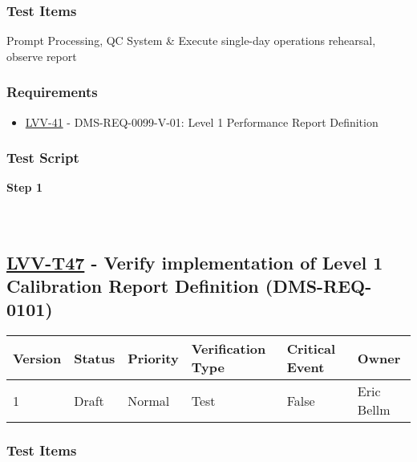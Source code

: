 \hypertarget{test-items-135}{%
\subsubsection{Test Items}\label{test-items-135}}

Prompt Processing, QC System \& Execute single-day operations rehearsal,
observe report

\hypertarget{requirements-136}{%
\subsubsection{Requirements}\label{requirements-136}}

\begin{itemize}
\tightlist
\item
  \href{https://jira.lsstcorp.org/browse/LVV-41}{LVV-41} -
  DMS-REQ-0099-V-01: Level 1 Performance Report Definition
\end{itemize}

\hypertarget{test-script-136}{%
\subsubsection{Test Script}\label{test-script-136}}

\textbf{Step 1}\\
~\\
~\\

\hypertarget{lvv-t47---verify-implementation-of-level-1-calibration-report-definition-dms-req-0101}{%
\subsection{\texorpdfstring{\href{https://jira.lsstcorp.org/secure/Tests.jspa\#/testCase/LVV-T47}{LVV-T47}
- Verify implementation of Level 1 Calibration Report Definition
(DMS-REQ-0101)}{LVV-T47 - Verify implementation of Level 1 Calibration Report Definition (DMS-REQ-0101)}}\label{lvv-t47---verify-implementation-of-level-1-calibration-report-definition-dms-req-0101}}

\begin{longtable}[]{@{}llllll@{}}
\toprule
Version & Status & Priority & Verification Type & Critical Event &
Owner\tabularnewline
\midrule
\endhead
1 & Draft & Normal & Test & False & Eric Bellm\tabularnewline
\bottomrule
\end{longtable}

\hypertarget{test-items-136}{%
\subsubsection{Test Items}\label{test-items-136}}

